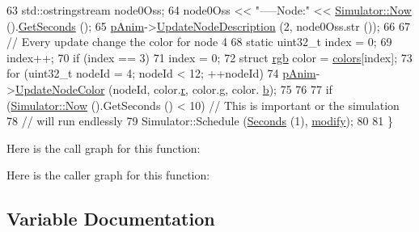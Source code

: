 \begin{DoxyCode}
63   std::ostringstream node0Oss;
64   node0Oss << \textcolor{stringliteral}{"-----Node:"} << \hyperlink{group__simulator_gac3635e2e87f7ce316c89290ee1b01d0d}{Simulator::Now} ().\hyperlink{classns3_1_1Time_a8f20d5c3b0902d7b4320982f340b57c8}{GetSeconds} ();
65   \hyperlink{colors-link-description_8cc_a4d1b1f8e5dece91ab32ba77a17ec7978}{pAnim}->\hyperlink{classns3_1_1AnimationInterface_adaad6891a737119ff48304aed442fedd}{UpdateNodeDescription} (2, node0Oss.str ());
66 
67   \textcolor{comment}{// Every update change the color for node 4}
68   \textcolor{keyword}{static} uint32\_t index = 0;
69   index++;
70   \textcolor{keywordflow}{if} (index == 3) 
71     index = 0;
72   \textcolor{keyword}{struct }\hyperlink{structrgb}{rgb} color = \hyperlink{colors-link-description_8cc_aeede5006703c01b469f27688e8e9827d}{colors}[index];
73   \textcolor{keywordflow}{for} (uint32\_t nodeId = 4; nodeId < 12; ++nodeId)
74     \hyperlink{colors-link-description_8cc_a4d1b1f8e5dece91ab32ba77a17ec7978}{pAnim}->\hyperlink{classns3_1_1AnimationInterface_adba07ccf6613113799782712287720cb}{UpdateNodeColor} (nodeId, color.\hyperlink{structrgb_afd9a3feaf22de2f96ba25d19494235a6}{r}, color.\hyperlink{structrgb_a644713f43fbcf5e9f070fa1843aee55f}{g}, color.
      \hyperlink{structrgb_a5ff4e0f515919a82c3f401afa8555da4}{b}); 
75 
76 
77   \textcolor{keywordflow}{if} (\hyperlink{group__simulator_gac3635e2e87f7ce316c89290ee1b01d0d}{Simulator::Now} ().GetSeconds () < 10) \textcolor{comment}{// This is important or the simulation}
78     \textcolor{comment}{// will run endlessly}
79     Simulator::Schedule (\hyperlink{group__timecivil_ga33c34b816f8ff6628e33d5c8e9713b9e}{Seconds} (1), \hyperlink{colors-link-description_8cc_a7a2a3abb755d0d1a31414355520d054b}{modify});
80 
81 \}
\end{DoxyCode}


Here is the call graph for this function\+:




Here is the caller graph for this function\+:




\subsection{Variable Documentation}
